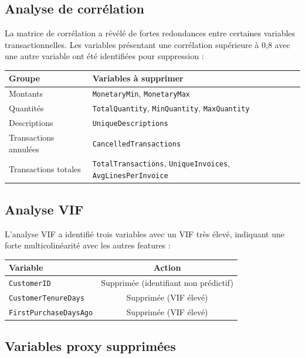 \documentclass[11pt,a4paper]{article}
\begin{document}
\subsection{Analyse de corrélation}

La matrice de corrélation a révélé de fortes redondances entre certaines variables transactionnelles. Les variables présentant une corrélation supérieure à 0,8 avec une autre variable ont été identifiées pour suppression :

\begin{center}
\begin{tabular}{ll}
\toprule
\textbf{Groupe} & \textbf{Variables à supprimer} \\
\midrule
Montants & \texttt{MonetaryMin}, \texttt{MonetaryMax} \\
Quantités & \texttt{TotalQuantity}, \texttt{MinQuantity}, \texttt{MaxQuantity} \\
Descriptions & \texttt{UniqueDescriptions} \\
Transactions annulées & \texttt{CancelledTransactions} \\
Transactions totales & \texttt{TotalTransactions}, \texttt{UniqueInvoices}, \texttt{AvgLinesPerInvoice} \\
\bottomrule
\end{tabular}
\end{center}

\subsection{Analyse VIF}

L'analyse VIF a identifié trois variables avec un VIF très élevé, indiquant une forte multicolinéarité avec les autres features :

\begin{center}
\begin{tabular}{lc}
\toprule
\textbf{Variable} & \textbf{Action} \\
\midrule
\texttt{CustomerID} & Supprimée (identifiant non prédictif) \\
\texttt{CustomerTenureDays} & Supprimée (VIF élevé) \\
\texttt{FirstPurchaseDaysAgo} & Supprimée (VIF élevé) \\
\bottomrule
\end{tabular}
\end{center}

\subsection{Variables proxy supprimées}
\end{document}
